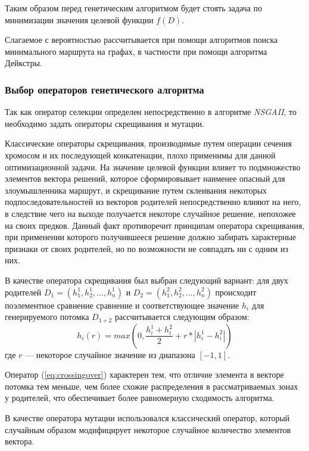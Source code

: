 Таким образом перед генетическим алгоритмом будет стоять задача по минимизации значения целевой функции $f(D)$.

Слагаемое с вероятностью рассчитывается при помощи алгоритмов поиска минимального маршрута на графах, в частности при помощи алгоритма Дейкстры.

\subsubsection{Выбор операторов генетического алгоритма}\hspace*{\fill}

Так как оператор селекции определен непосредственно в алгоритме \textit{NSGAII}, то необходимо задать операторы скрещивания и мутации.

Классические операторы скрещивания, производимые путем операции сечения хромосом и их последующей конкатенации, плохо применимы для данной оптимизационной задачи. На значение целевой функции влияет то подмножество элементов вектора решений, которое сформировывает наименее опасный для злоумышленника маршрут, и скрещивание путем склеивания некоторых подпоследовательностей из векторов родителей непосредственно влияют на него, в следствие чего на выходе получается некоторе случайное решение, непохожее на своих предков. Данный факт противоречит принципам оператора скрещивания, при применении которого получившееся решение должно забирать характерные признаки от своих родителей, но по возможности не совпадать ни с одним из них.


В качестве оператора скрещивания был выбран следующий вариант: для двух родителей $D_1 = (h_1^1, h_2^1, ..., h_n^1)$ и $D_2 = (h_1^2, h_2^2, ..., h_n^2)$ происходит поэлементное сравнение сравнение и соответствующее значение $h_i$ для генерируемого потомка $D_{1+2}$ рассчитывается следующим образом:
\begin{equation}
\label{eq:crossingover}
h_i(r) = max(0, \frac{h_i^1 + h_i^2}{2} + r * |h_i^1 - h_i^2|)
\end{equation}
где $r$ ---  некоторое случайное значение из диапазона $[-1,1]$.

Оператор (\ref{eq:crossingover}) характерен тем, что отличие элемента в векторе потомка тем меньше, чем более схожие распределения в рассматриваемых зонах у родителей, что обеспечивает более равномерную сходимость алгоритма.

В качестве оператора мутации использовался классический оператор, который случайным образом модифицирует некоторое случайное количество элементов вектора.

